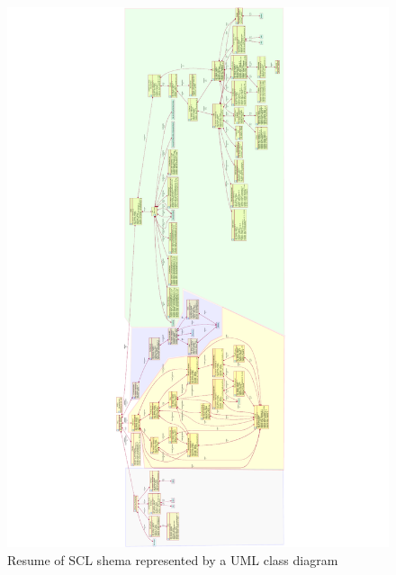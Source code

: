 \begin{landscape}

\begin{figure}
  \includegraphics[angle=-90,
  width=1.0\linewidth]{chapters/ch-scl/figures/SCL-uml-Resumen-inherited}
  \caption{Resume of SCL shema represented by a UML class diagram}
  \label{fig:SCL-uml-Resumen}
\end{figure}
\end{landscape}
